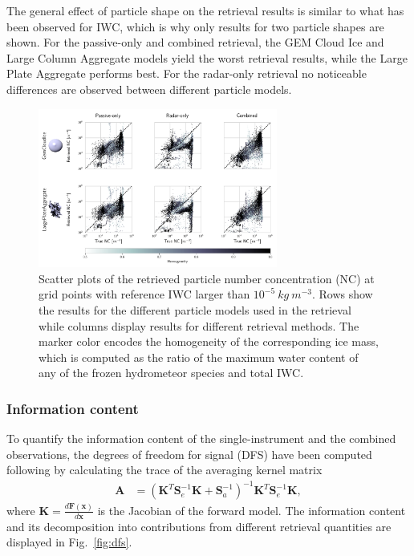 \documentclass[journal abbreviation, manuscript]{copernicus}
\begin{document}
The general effect of particle shape on the retrieval results is similar to what
has been observed for IWC, which is why only results for two particle shapes are
shown. For the passive-only and combined retrieval, the GEM Cloud Ice and Large
Column Aggregate models yield the worst retrieval results, while the Large Plate
Aggregate performs best. For the radar-only retrieval no noticeable differences
are observed between different particle models.

\begin{figure}
\centering
\includegraphics[width = 0.7\textwidth]{../plots/results_nd_scatter_a}
\caption{Scatter plots of the retrieved particle number concentration (NC) at
  grid points with reference IWC larger than $10^{-5}\ \unit{kg\ m^{-3}}$. Rows
  show the results for the different particle models used in the retrieval while
  columns display results for different retrieval methods. The marker color
  encodes the homogeneity of the corresponding ice mass, which is computed as
  the ratio of the maximum water content of any of the frozen hydrometeor
  species and total IWC.}
\label{fig:results_nd_scatter_a}
\end{figure}

\subsubsection{Information content}

To quantify the information content of the single-instrument and the combined
observations, the degrees of freedom for signal (DFS) have been computed
following \cite{rodgers00} by calculating the trace of the averaging kernel
matrix
\begin{align}
  \mathbf{A} &= (\mathbf{K}^T \mathbf{S}_e^{-1} \mathbf{K} +
  \mathbf{S}_a^{-1})^{-1} \mathbf{K}^T \mathbf{S}_e^{-1} \mathbf{K},
\end{align}
where $\mathbf{K} = \frac{d\mathbf{F}(\mathbf{x})}{d\mathbf{x}}$ is the Jacobian
of the forward model. The information content and its decomposition into
contributions from different retrieval quantities are displayed in
Fig.~\ref{fig:dfs}.
\end{document}
